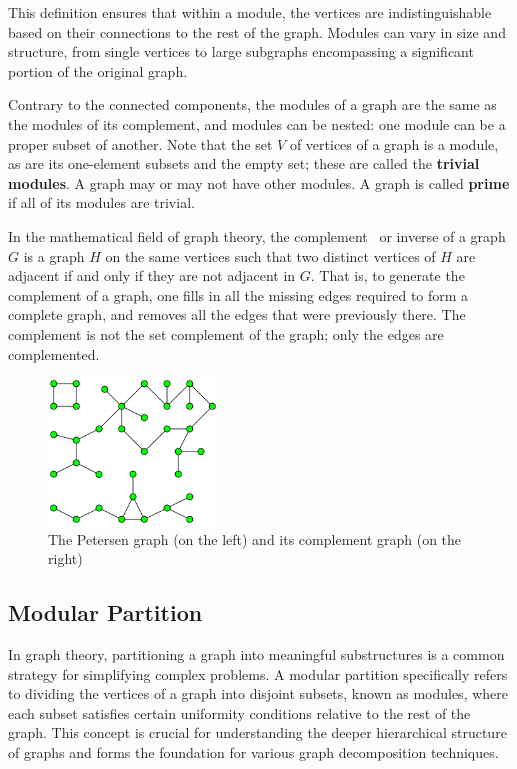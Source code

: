This definition ensures that within a module, the vertices are indistinguishable based on their connections to the rest of the graph.
Modules can vary in size and structure, from single vertices to large subgraphs encompassing a significant portion of the original graph.

Contrary to the connected components, the modules of a graph are the same as the modules of its complement, and modules can be nested: one module can be a proper subset of another.
Note that the set $V$ of vertices of a graph is a module, as are its one-element subsets and the empty set; these are called the \textbf{trivial modules}.
A graph may or may not have other modules.
A graph is called \textbf{prime} if all of its modules are trivial.

In the mathematical field of graph theory, the complement~\cite{complementgraphwikipedia} or inverse of a graph $G$ is a graph $H$ on the same vertices such that two distinct vertices of $H$ are adjacent if and only if they are not adjacent in $G$.
That is, to generate the complement of a graph, one fills in all the missing edges required to form a complete graph, and removes all the edges that were previously there.
The complement is not the set complement of the graph; only the edges are complemented.

\begin{figure}[!h]
    \centering
    \includegraphics[width=0.40\textwidth]{images/graphs/Pseudoforest}
    \caption{The Petersen graph (on the left) and its complement graph (on the right) \cite{complementgraphwikipedia}}
    \label{fig:the}
\end{figure}


\subsection*{Modular Partition}\label{subsec:modular-partition}

In graph theory, partitioning a graph into meaningful substructures is a common strategy for simplifying complex problems.
A modular partition specifically refers to dividing the vertices of a graph into disjoint subsets, known as modules, where each subset satisfies certain uniformity conditions relative to the rest of the graph.
This concept is crucial for understanding the deeper hierarchical structure of graphs and forms the foundation for various graph decomposition techniques.

